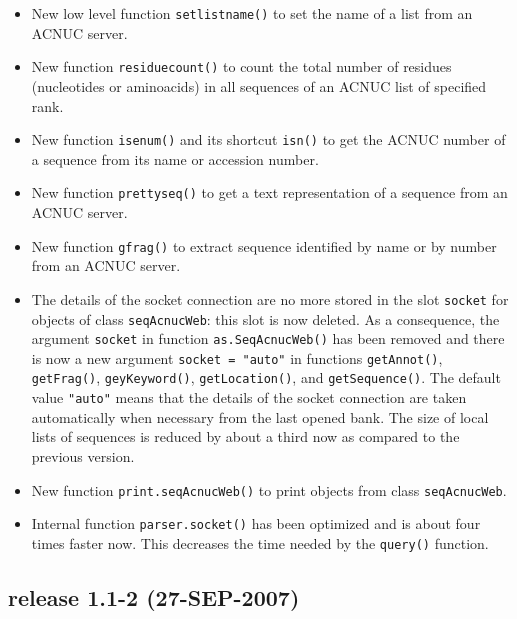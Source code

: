 \documentclass{article}
\begin{document}
\begin{itemize}
\item New low level function \texttt{setlistname()} to set the name of
  a list from an ACNUC server.

\item New function \texttt{residuecount()} to count the total number
  of residues (nucleotides or aminoacids) in all sequences of an ACNUC
  list of specified rank.

\item New function \texttt{isenum()} and its shortcut \texttt{isn()}
  to get the ACNUC number of a sequence from its name or accession
  number.

\item New function \texttt{prettyseq()} to get a text representation
  of a sequence from an ACNUC server.

\item New function \texttt{gfrag()} to extract sequence identified by
  name or by number from an ACNUC server.

\item The details of the socket connection are no more stored in
  the slot \texttt{socket} for objects of class \texttt{seqAcnucWeb}:
  this slot is now deleted. As a consequence, the argument
  \texttt{socket} in function \texttt{as.SeqAcnucWeb()} has been
  removed and there is now a new
  argument \texttt{socket = "auto"} in functions \texttt{getAnnot()},
  \texttt{getFrag()}, \texttt{geyKeyword()}, \texttt{getLocation()},
  and \texttt{getSequence()}. The default value \texttt{"auto"} means
  that the details of the socket connection are taken automatically
  when necessary from the last opened bank. The size of local lists
  of sequences is reduced by about a third now as compared to the
  previous version.

\item New function \texttt{print.seqAcnucWeb()} to print objects from
  class \texttt{seqAcnucWeb}.

\item Internal function \texttt{parser.socket()} has been optimized and
  is about four times faster now. This decreases the time needed by the
  \texttt{query()} function.

\end{itemize}

\subsection*{release 1.1-2 (27-SEP-2007)}
\end{document}

